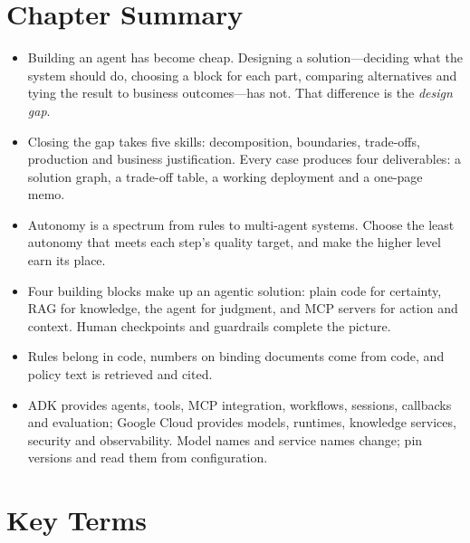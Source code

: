 \section*{Chapter Summary}

\begin{itemize}[itemsep=2pt]
  \item Building an agent has become cheap. Designing a solution---deciding what the system should do, choosing a block for each part, comparing alternatives and tying the result to business outcomes---has not. That difference is the \emph{design gap}.
  \item Closing the gap takes five skills: decomposition, boundaries, trade-offs, production and business justification. Every case produces four deliverables: a solution graph, a trade-off table, a working deployment and a one-page memo.
  \item Autonomy is a spectrum from rules to multi-agent systems. Choose the least autonomy that meets each step's quality target, and make the higher level earn its place.
  \item Four building blocks make up an agentic solution: plain code for certainty, RAG for knowledge, the agent for judgment, and MCP servers for action and context. Human checkpoints and guardrails complete the picture.
  \item Rules belong in code, numbers on binding documents come from code, and policy text is retrieved and cited.
  \item ADK provides agents, tools, MCP integration, workflows, sessions, callbacks and evaluation; Google Cloud provides models, runtimes, knowledge services, security and observability. Model names and service names change; pin versions and read them from configuration.
\end{itemize}

\section*{Key Terms}

